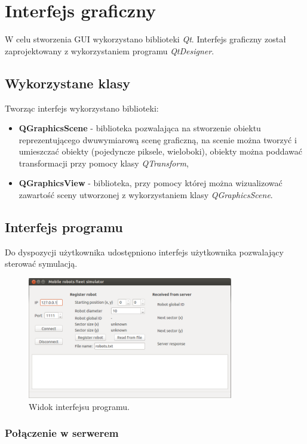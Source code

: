 \section{Interfejs graficzny}
W celu stworzenia GUI wykorzystano biblioteki \textit{Qt}. Interfejs graficzny został zaprojektowany z wykorzystaniem programu \textit{QtDesigner}.

\subsection{Wykorzystane klasy}
Tworząc interfejs wykorzystano biblioteki:

\begin{itemize}
\item \textbf{QGraphicsScene} - biblioteka pozwalająca na stworzenie obiektu reprezentującego dwuwymiarową scenę graficzną, na scenie można tworzyć i umieszczać obiekty (pojedyncze piksele, wieloboki), obiekty można poddawać transformacji przy pomocy klasy \textit{QTransform},
\item \textbf{QGraphicsView} - biblioteka, przy pomocy której można wizualizować zawartość sceny utworzonej z wykorzystaniem klasy \textit{QGraphicsScene}.
 \end{itemize}

\subsection{Interfejs programu}
Do dyspozycji użytkownika udostępniono interfejs użytkownika pozwalający sterować symulacją. 

\begin{figure}[!htp]
  \centering
  \includegraphics[width=0.8\textwidth]{img/klient.png}
  \caption{Widok interfejsu programu.}
  \label{fig:interfejs}
\end{figure}


	\subsubsection{Połączenie w serwerem}

